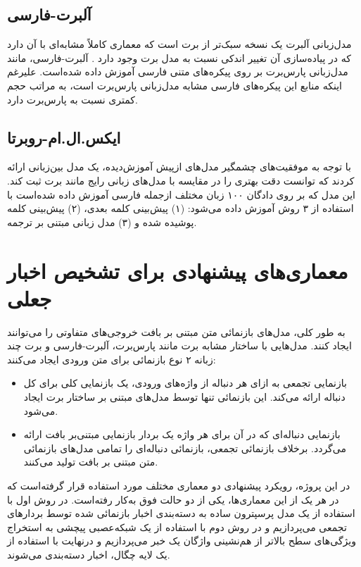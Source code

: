 \subsection{آلبرت-فارسی}
	مدل‌زبانی آلبرت یک نسخه سبک‌تر از برت است که معماری کاملاً مشابه‌ای با آن دارد که در پیاده‌سازی آن تغییر اندکی نسبت ‌به مدل برت وجود دارد \citep{ALBERTPersian}. آلبرت-فارسی، مانند مدل‌زبانی پارس‌برت بر روی  پیکره‌های متنی فارسی آموزش داده شده‌است. علیرغم اینکه منابع این پیکره‌های فارسی مشابه مدل‌زبانی پارس‌برت است، به ‌مراتب حجم  کمتری نسبت ‌به پارس‌برت دارد.
	
\subsection{ایکس.ال.ام-روبرتا}
	با توجه به موفقیت‌های چشمگیر مدل‌های ازپیش آموزش‌دیده، \cite{conneau2019unsupervised} یک مدل‌ بین‌زبانی ارائه کردند که توانست دقت بهتری را در مقایسه با مدل‌های زبانی رایج مانند برت ثبت کند. این مدل که بر روی دادگان ۱۰۰ زبان مختلف ازجمله فارسی آموزش داده شده‌است  با استفاده از ۳ روش آموزش داده می‌شود: (۱) پیش‌بینی کلمه بعدی، (۲) پیش‌بینی کلمه پوشیده شده و (۳) مدل زبانی مبتنی بر ترجمه.

\section{معماری‌های پیشنهادی برای تشخیص اخبار جعلی}
به طور کلی، مدل‌های بازنمائی متن مبتنی بر بافت خروجی‌های متفاوتی را می‌توانند ایجاد کنند. مدل‌هایی با ساختار مشابه برت مانند پارس‌برت، آلبرت-فارسی و برت چند زبانه ۲ نوع بازنمائی برای متن ورودی ایجاد می‌کنند:
\begin{itemize}
\item بازنمایی تجمعی به ازای هر دنباله از واژه‌های ورودی، یک بازنمایی کلی برای کل دنباله ارائه می‌کند.
این بازنمائی تنها توسط مدل‌های مبتنی بر ساختار برت ایجاد می‌شود.
\item بازنمایی دنباله‌ای که در آن برای هر واژه یک بردار بازنمایی مبتنی‌بر بافت ارائه
 می‌گردد. برخلاف بازنمائی تجمعی، بازنمائی دنباله‌ای را تمامی مدل‌های بازنمائی متن مبتنی بر بافت تولید می‌کنند.
\end{itemize}

در این پروژه، رویکرد پیشنهادی دو معماری مختلف مورد استفاده قرار گرفته‌است که در هر یک از این معماری‌ها، یکی از دو حالت فوق به‌کار رفته‌است. در روش اول با استفاده از یک مدل پرسپترون ساده به دسته‌بندی اخبار بازنمائی شده توسط بردار‌های تجمعی می‌پردازیم و در روش دوم با استفاده از یک شبکه‌‌عصبی پیچشی به استخراج ویژگی‌های سطح بالاتر از هم‌نشینی واژگان یک خبر می‌پردازیم و درنهایت با استفاده از یک لایه چگال، اخبار دسته‌بندی می‌شوند.


